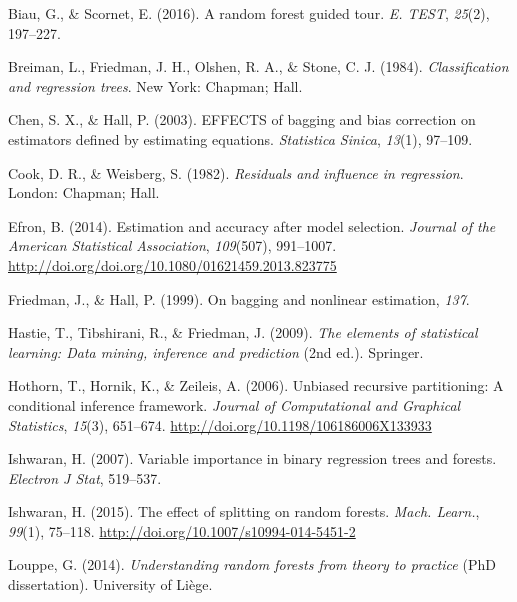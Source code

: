 \documentclass[12pt,twoside]{reedthesis}
\theoremstyle{definition}
\theoremstyle{definition}
\theoremstyle{definition}
\theoremstyle{remark}
\begin{document}

\noindent

\setlength{\parindent}{-0.20in} \setlength{\leftskip}{0.20in}
\setlength{\parskip}{8pt}

\hypertarget{refs}{}
\hypertarget{ref-biau2015a}{}
Biau, G., \& Scornet, E. (2016). A random forest guided tour. \emph{E.
TEST}, \emph{25}(2), 197--227.

\hypertarget{ref-breiman1984}{}
Breiman, L., Friedman, J. H., Olshen, R. A., \& Stone, C. J. (1984).
\emph{Classification and regression trees}. New York: Chapman; Hall.

\hypertarget{ref-chen2003}{}
Chen, S. X., \& Hall, P. (2003). EFFECTS of bagging and bias correction
on estimators defined by estimating equations. \emph{Statistica Sinica},
\emph{13}(1), 97--109.

\hypertarget{ref-cook1982}{}
Cook, D. R., \& Weisberg, S. (1982). \emph{Residuals and influence in
regression}. London: Chapman; Hall.

\hypertarget{ref-efron2014}{}
Efron, B. (2014). Estimation and accuracy after model selection.
\emph{Journal of the American Statistical Association}, \emph{109}(507),
991--1007. \url{http://doi.org/doi.org/10.1080/01621459.2013.823775}

\hypertarget{ref-hall1999}{}
Friedman, J., \& Hall, P. (1999). On bagging and nonlinear estimation,
\emph{137}.

\hypertarget{ref-esl2009}{}
Hastie, T., Tibshirani, R., \& Friedman, J. (2009). \emph{The elements
of statistical learning: Data mining, inference and prediction} (2nd
ed.). Springer.

\hypertarget{ref-hothorn2006}{}
Hothorn, T., Hornik, K., \& Zeileis, A. (2006). Unbiased recursive
partitioning: A conditional inference framework. \emph{Journal of
Computational and Graphical Statistics}, \emph{15}(3), 651--674.
\url{http://doi.org/10.1198/106186006X133933}

\hypertarget{ref-ishwaran2007}{}
Ishwaran, H. (2007). Variable importance in binary regression trees and
forests. \emph{Electron J Stat}, 519--537.

\hypertarget{ref-ishwaran2015}{}
Ishwaran, H. (2015). The effect of splitting on random forests.
\emph{Mach. Learn.}, \emph{99}(1), 75--118.
\url{http://doi.org/10.1007/s10994-014-5451-2}

\hypertarget{ref-louppe2014}{}
Louppe, G. (2014). \emph{Understanding random forests from theory to
practice} (PhD dissertation). University of Liège.
\end{document}
